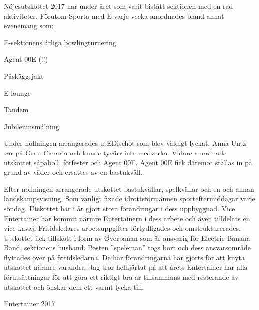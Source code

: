 \documentclass[../_main/handlingar.tex]{subfiles}
\begin{document}
Nöjesutskottet 2017 har under året som varit bistått sektionen med en rad aktiviteter.
Förutom Sporta med E varje vecka anordnades bland annat evenemang som:

\begin{dashlist}
 \item E-sektionens årliga bowlingturnering
 \item Agent 00E (!!)
 \item Påskäggsjakt
 \item E-lounge
 \item Tandem
 \item Jubileumsmålning

\end{dashlist}
Under nollningen arrangerades utEDischot som blev väldigt lyckat. Anna Untz var på Gran
Canaria och kunde tyvärr inte medverka. Vidare anordnade utskottet såpaboll, förfester
och Agent 00E. Agent 00E fick däremot ställas in på grund av väder och ersattes av en
bastukväll.

Efter nollningen arrangerade utskottet bastukvällar, spelkvällar och en och annan
landskampsvisning. Som vanligt fixade idrottsförmännen sporteftermiddagar varje söndag.
Utskottet har i år gjort stora förändringar i dess uppbyggnad. Vice Entertainer har kommit
närmre Entertainern i dess arbete och även tilldelats en vice-kavaj. Fritidsledares
arbetsuppgifter förtydligades och omstrukturerades. Utskottet fick tillskott i form av
Øverbanan som är ansvarig för Electric Banana Band, sektionens husband. Posten
”speleman” togs bort och dess ansvarsområde flyttades över på fritidsledarna.
De här förändringarna har gjorts för att knyta utskottet närmre varandra. Jag tror helhjärtat
på att årets Entertainer har alla förutsättningar för att göra ett riktigt bra år tillsammans
med resterande av utskottet och önskar dem ett varmt lycka till.
\begin{signatures}{1}
    \mvh
    \signature{Albin Nyström Eklund}{Entertainer 2017}
\end{signatures}
\end{document}
